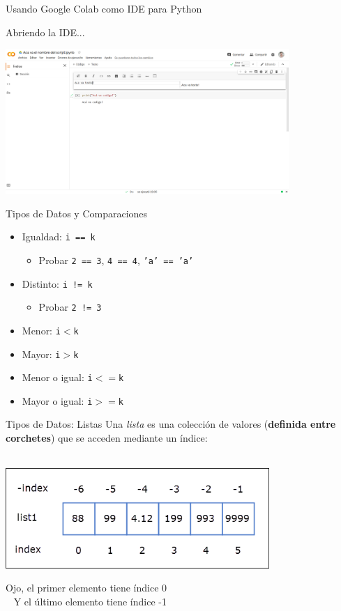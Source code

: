 \documentclass{beamer}
\begin{document}
\begin{frame}{Usando Google Colab como IDE para Python}
\begin{block}{Abriendo la IDE...}
\end{block}
\includegraphics[height=5.5cm]{colab_raw.png}
\end{frame}


\begin{frame}{Tipos de Datos y Comparaciones}
\begin{itemize}
	\item Igualdad: \texttt{i == k}\pause
	\begin{itemize}
		\item Probar \texttt{2 == 3}, \texttt{4 == 4}, \texttt{'a' == 'a'}
	\end{itemize}\pause
	\item Distinto: \texttt{i != k}\pause
	\begin{itemize}
		\item  Probar \texttt{2 != 3}
	\end{itemize}\pause
	\item Menor: \texttt{i$<$k}\pause
	\item Mayor: \texttt{i$>$k}\pause
	\item Menor o igual: \texttt{i$<=$k}\pause
	\item Mayor o igual: \texttt{i$>=$k}
\end{itemize}
\end{frame}

\begin{frame}{Tipos de Datos:  Listas}
Una \emph{lista} es una colección de valores (\textbf{definida entre corchetes}) que se acceden mediante un índice:  \pause
\\~\

\includegraphics[width=10cm]{lista.png} \pause

\alert{Ojo, el primer elemento tiene índice 0}\pause
\\~
\alert{Y el último elemento tiene índice -1}
\end{frame}
\end{document}
